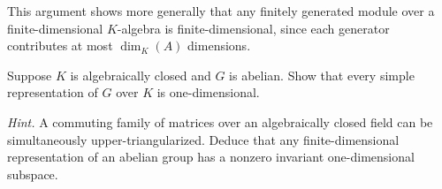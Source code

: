 \begin{remark}
This argument shows more generally that any finitely generated module over a finite-dimensional
$K$-algebra is finite-dimensional, since each generator contributes at most $\dim_K(A)$ dimensions.
\end{remark}


\begin{exercise}[1.2.9]\label{ex:1.2.9}
Suppose $K$ is algebraically closed and $G$ is abelian.
Show that every simple representation of $G$ over $K$ is one-dimensional.

\emph{Hint.}  
A commuting family of matrices over an algebraically closed field can be simultaneously
upper-triangularized. Deduce that any finite-dimensional representation of an abelian group
has a nonzero invariant one-dimensional subspace.
\end{exercise}

